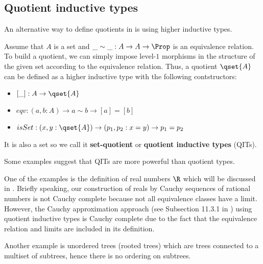 \subsection{Quotient inductive types}



An alternative way to define quotients in \hott is using higher
inductive types.


Assume that $A$ is a set and $\_\sim\_ : A \to A \to \Prop$ is an
equivalence relation.  To build a quotient, we can simply impose
level-$1$ morphisms in the structure of the given set according to the
equivalence relation. Thus, a quotient $\qset{A}$ can be defined as a
higher inductive type with the following contstructors:

\begin{itemize}
\item $[\_] : A \rightarrow \qset{A}$
\item $eqv : (a,b : A) \rightarrow a \sim b \rightarrow  [a] = [b]$
\item $isSet : (x,y:\qset{A}) \rightarrow (p_1,p_2 : x = y) \rightarrow p_1 = p_2$
\end{itemize}

It is also a set so we call it \textbf{set-quotient} or
\textbf{quotient inductive types} (QITs).


Some examples suggest that QITs are more powerful than quotient types.

One of the examples is the definition of real numbers $\R$ which will be discussed in . Briefly speaking, our construction of reals by Cauchy sequences of rational numbers is not Cauchy complete because not all  equivalence classes have a limit. However, the Cauchy approximation approach (see Subsection 11.3.1 in \cite{hott}) using quotient inductive types is Cauchy complete due to the fact that the equivalence relation and limits are included in its definition.

Another example is unordered trees (rooted trees) which are trees
connected to a multiset of subtrees, hence there is no ordering on
subtrees.

